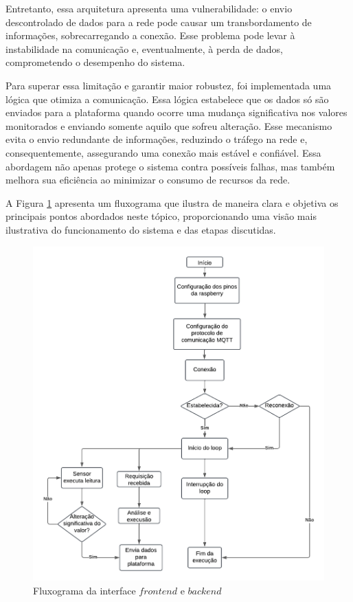 \documentclass{ecatfg}
\begin{document}
Entretanto, essa arquitetura apresenta uma vulnerabilidade: o envio descontrolado de dados para a rede pode causar um transbordamento de informações, sobrecarregando a conexão. Esse problema pode levar à instabilidade na comunicação e, eventualmente, à perda de dados, comprometendo o desempenho do sistema. \par

Para superar essa limitação e garantir maior robustez, foi implementada uma lógica que otimiza a comunicação. Essa lógica estabelece que os dados só são enviados para a plataforma quando ocorre uma mudança significativa nos valores monitorados e enviando somente aquilo que sofreu alteração. Esse mecanismo evita o envio redundante de informações, reduzindo o tráfego na rede e, consequentemente, assegurando uma conexão mais estável e confiável. Essa abordagem não apenas protege o sistema contra possíveis falhas, mas também melhora sua eficiência ao minimizar o consumo de recursos da rede. \par

A Figura \ref{fig:6} apresenta um fluxograma que ilustra de maneira clara e objetiva os principais pontos abordados neste tópico, proporcionando uma visão mais ilustrativa do funcionamento do sistema e das etapas discutidas. \par

\begin{figure}[!htb]
    \centering
    \includegraphics[scale=0.16]{Figuras/fluxograma_front_backend.png}
    \caption{Fluxograma da interface $frontend$ e $backend$}
    \label{fig:6}
\end{figure}
\end{document}
